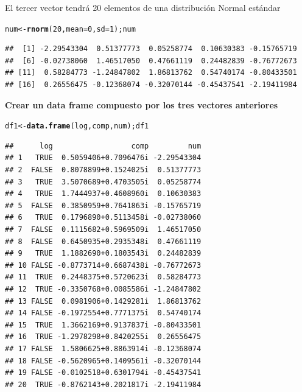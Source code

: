 \documentclass[12pt,letterpaper]{article}\usepackage[]{graphicx}\usepackage[]{color}
\makeatletter
\newcommand{\hlnum}[1]{\textcolor[rgb]{0.686,0.059,0.569}{#1}}%
\newcommand{\hlstd}[1]{\textcolor[rgb]{0.345,0.345,0.345}{#1}}%
\newcommand{\hlkwb}[1]{\textcolor[rgb]{0.69,0.353,0.396}{#1}}%
\newcommand{\hlkwc}[1]{\textcolor[rgb]{0.333,0.667,0.333}{#1}}%
\newcommand{\hlkwd}[1]{\textcolor[rgb]{0.737,0.353,0.396}{\textbf{#1}}}%
\newenvironment{kframe}{%
 \def\at@end@of@kframe{}%
 \ifinner\ifhmode%
  \def\at@end@of@kframe{\end{minipage}}%
  \begin{minipage}{\columnwidth}%
 \fi\fi%
 \def\FrameCommand##1{\hskip\@totalleftmargin \hskip-\fboxsep
 \colorbox{shadecolor}{##1}\hskip-\fboxsep
     \hskip-\linewidth \hskip-\@totalleftmargin \hskip\columnwidth}%
 \MakeFramed {\advance\hsize-\width
   \@totalleftmargin\z@ \linewidth\hsize
   \@setminipage}}%
 {\par\unskip\endMakeFramed%
 \at@end@of@kframe}
\newenvironment{knitrout}{}{} %
\makeatother
\begin{document}
El tercer vector tendr\'a 20 elementos de una distribuci\'on Normal est\'andar 
\begin{knitrout}
\color{fgcolor}\begin{kframe}
\begin{alltt}
\hlstd{num} \hlkwb{<-} \hlkwd{rnorm}\hlstd{(}\hlnum{20}\hlstd{,} \hlkwc{mean}\hlstd{=}\hlnum{0}\hlstd{,} \hlkwc{sd}\hlstd{=}\hlnum{1}\hlstd{); num}
\end{alltt}
\begin{verbatim}
##  [1] -2.29543304  0.51377773  0.05258774  0.10630383 -0.15765719
##  [6] -0.02738060  1.46517050  0.47661119  0.24482839 -0.76772673
## [11]  0.58284773 -1.24847802  1.86813762  0.54740174 -0.80433501
## [16]  0.26556475 -0.12368074 -0.32070144 -0.45437541 -2.19411984
\end{verbatim}
\end{kframe}
\end{knitrout}

\textbf{Crear un data frame compuesto por los tres vectores anteriores}
\begin{knitrout}
\color{fgcolor}\begin{kframe}
\begin{alltt}
\hlstd{df1} \hlkwb{<-} \hlkwd{data.frame}\hlstd{(log, comp, num); df1}
\end{alltt}
\begin{verbatim}
##      log                  comp         num
## 1   TRUE  0.5059406+0.7096476i -2.29543304
## 2  FALSE  0.8078899+0.1524025i  0.51377773
## 3   TRUE  3.5070689+0.4703505i  0.05258774
## 4   TRUE  1.7444937+0.4608960i  0.10630383
## 5  FALSE  0.3850959+0.7641863i -0.15765719
## 6   TRUE  0.1796890+0.5113458i -0.02738060
## 7  FALSE  0.1115682+0.5969509i  1.46517050
## 8  FALSE  0.6450935+0.2935348i  0.47661119
## 9   TRUE  1.1882690+0.1803543i  0.24482839
## 10 FALSE -0.8773714+0.6687438i -0.76772673
## 11  TRUE  0.2448375+0.5720623i  0.58284773
## 12  TRUE -0.3350768+0.0085586i -1.24847802
## 13 FALSE  0.0981906+0.1429281i  1.86813762
## 14 FALSE -0.1972554+0.7771375i  0.54740174
## 15  TRUE  1.3662169+0.9137837i -0.80433501
## 16  TRUE -1.2978298+0.8420255i  0.26556475
## 17 FALSE  1.5806625+0.8863914i -0.12368074
## 18 FALSE -0.5620965+0.1409561i -0.32070144
## 19 FALSE -0.0102518+0.6301794i -0.45437541
## 20  TRUE -0.8762143+0.2021817i -2.19411984
\end{verbatim}
\end{kframe}
\end{knitrout}
\end{document}
